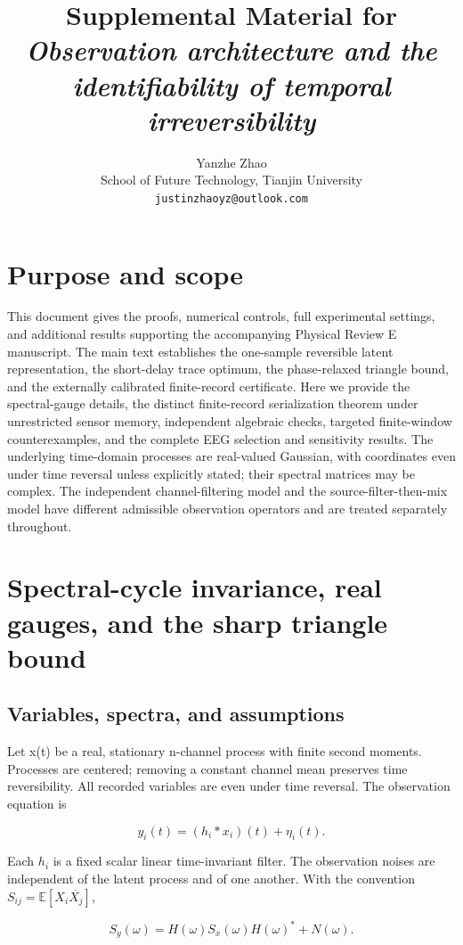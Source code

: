 \documentclass[11pt,a4paper]{article}
\title{Supplemental Material for \\ \emph{Observation architecture and the identifiability of temporal irreversibility}}
\author{Yanzhe Zhao\\School of Future Technology, Tianjin University\\\texttt{justinzhaoyz@outlook.com}}
\date{}
\begin{document}
\maketitle

\section*{Purpose and scope}

This document gives the proofs, numerical controls, full experimental settings, and additional results supporting the accompanying Physical Review E manuscript. The main text establishes the one-sample reversible latent representation, the short-delay trace optimum, the phase-relaxed triangle bound, and the externally calibrated finite-record certificate. Here we provide the spectral-gauge details, the distinct finite-record serialization theorem under unrestricted sensor memory, independent algebraic checks, targeted finite-window counterexamples, and the complete EEG selection and sensitivity results. The underlying time-domain processes are real-valued Gaussian, with coordinates even under time reversal unless explicitly stated; their spectral matrices may be complex. The independent channel-filtering model and the source-filter-then-mix model have different admissible observation operators and are treated separately throughout.

\section{Spectral-cycle invariance, real gauges, and the sharp triangle bound}

\subsection{Variables, spectra, and assumptions}

Let x(t) be a real, stationary n-channel process with finite second moments. Processes are centered; removing a constant channel mean preserves time reversibility. All recorded variables are even under time reversal. The observation equation is

\[y_i(t)=(h_i*x_i)(t)+\eta_i(t).\]

Each $h_i$ is a fixed scalar linear time-invariant filter. The observation noises are independent of the latent process and of one another. With the convention \(S_{ij}=\mathbb E[X_i\overline{X_j}]\),

\[S_y(\omega)=H(\omega)S_x(\omega)H(\omega)^*+N(\omega).\]
\end{document}
